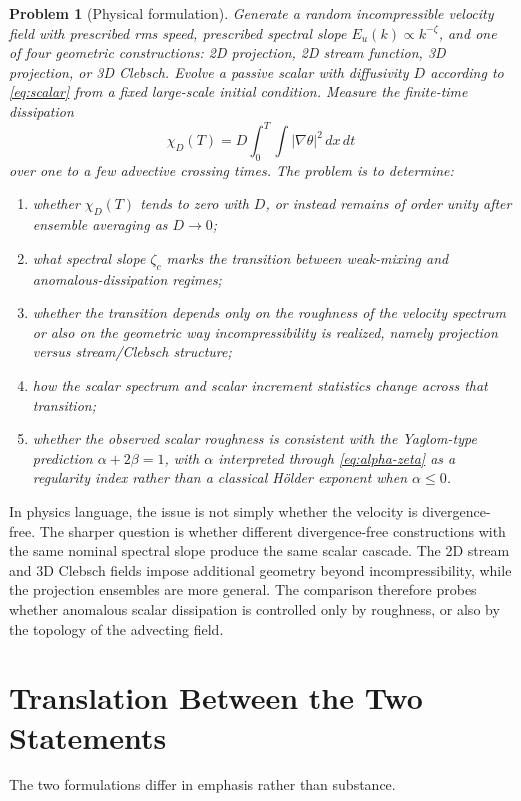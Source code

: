 \documentclass[11pt]{article}
\newtheorem{problem}{Problem}
\begin{document}
\begin{problem}[Physical formulation]
Generate a random incompressible velocity field with prescribed rms speed, prescribed spectral slope $E_u(k)\propto k^{-\zeta}$, and one of four geometric constructions: 2D projection, 2D stream function, 3D projection, or 3D Clebsch. Evolve a passive scalar with diffusivity $D$ according to \eqref{eq:scalar} from a fixed large-scale initial condition. Measure the finite-time dissipation
\[
\chi_D(T)=D\int_0^T\int |\nabla \theta|^2\,dx\,dt
\]
over one to a few advective crossing times. The problem is to determine:
\begin{enumerate}
\item whether $\chi_D(T)$ tends to zero with $D$, or instead remains of order unity after ensemble averaging as $D\to 0$;
\item what spectral slope $\zeta_c$ marks the transition between weak-mixing and anomalous-dissipation regimes;
\item whether the transition depends only on the roughness of the velocity spectrum or also on the geometric way incompressibility is realized, namely projection versus stream/Clebsch structure;
\item how the scalar spectrum and scalar increment statistics change across that transition;
\item whether the observed scalar roughness is consistent with the Yaglom-type prediction $\alpha+2\beta=1$, with $\alpha$ interpreted through \eqref{eq:alpha-zeta} as a regularity index rather than a classical H\"older exponent when $\alpha\le 0$.
\end{enumerate}
\end{problem}

In physics language, the issue is not simply whether the velocity is divergence-free. The sharper question is whether different divergence-free constructions with the same nominal spectral slope produce the same scalar cascade. The 2D stream and 3D Clebsch fields impose additional geometry beyond incompressibility, while the projection ensembles are more general. The comparison therefore probes whether anomalous scalar dissipation is controlled only by roughness, or also by the topology of the advecting field.

\section{Translation Between the Two Statements}
The two formulations differ in emphasis rather than substance.
\end{document}
